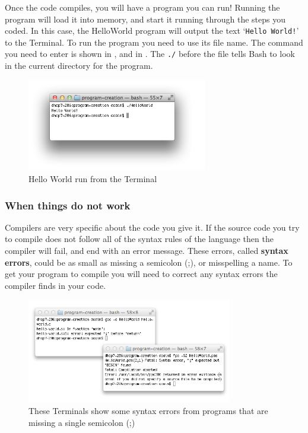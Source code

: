 Once the code compiles, you will have a program you can run! Running the program will load it into memory, and start it running through the steps you coded. In this case, the HelloWorld program will output the text `\texttt{Hello World!}' to the Terminal. To run the program you need to use its file name. The command you need to enter is shown in , and in . The \texttt{./} before the file tells Bash to look in the current directory for the program.


\begin{figure}[h]
   \centering
   \includegraphics[width=0.7\textwidth]{./topics/programs-and-compilers/images/HelloWorld} 
   \caption[Hello World Terminal]{Hello World run from the Terminal}
   \label{fig:run-helloworld}
\end{figure}


\subsubsection{When things do not work} %
\label{ssub:when_things_do_not_work}

Compilers are very specific about the code you give it. If the source code you try to compile does not follow all of the syntax rules of the language then the compiler will fail, and end with an error message. These errors, called \textbf{syntax errors}, could be as small as missing a semicolon (;), or misspelling a name. To get your program to compile you will need to correct any syntax errors the compiler finds in your code.

\begin{figure}[h]
   \centering
   \includegraphics[width=0.8\textwidth]{./topics/programs-and-compilers/images/SyntaxErrors} 
   \caption{These Terminals show some syntax errors from programs that are missing a single semicolon (;)}
   \label{fig:syntax-errors}
\end{figure}

